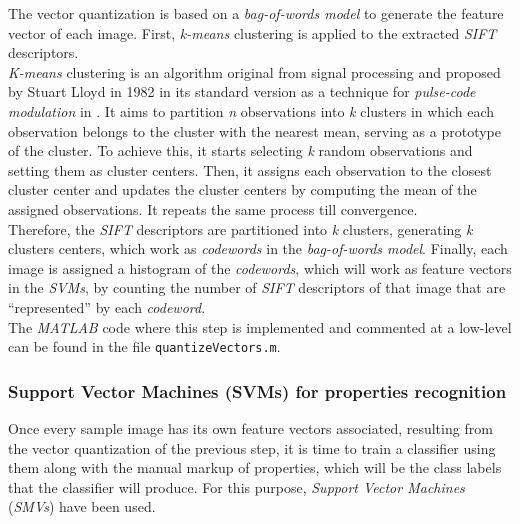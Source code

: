 
The vector quantization is based on a \emph{bag-of-words model} to generate the feature vector of each image. First, \emph{k-means} clustering is applied to the extracted \emph{SIFT} descriptors. \\

\emph{K-means} clustering is an algorithm original from signal processing and proposed by Stuart Lloyd in 1982 in its standard version as a technique for \emph{pulse-code modulation} in \cite{Lloyd_1982_LSQ}. It aims to partition \emph{n} observations into \emph{k} clusters in which each observation belongs to the cluster with the nearest mean, serving as a prototype of the cluster. To achieve this, it starts selecting \emph{k} random observations and setting them as cluster centers. Then, it assigns each observation to the closest cluster center and updates the cluster centers by computing the mean of the assigned observations. It repeats the same process till convergence. \\

Therefore, the \emph{SIFT} descriptors are partitioned into \emph{k} clusters, generating \emph{k} clusters centers, which work as \emph{codewords} in the \emph{bag-of-words model}. Finally, each image is assigned a histogram of the \emph{codewords}, which will work as feature vectors in the \emph{SVMs}, by counting the number of \emph{SIFT} descriptors of that image that are ``represented'' by each \emph{codeword}. \\

The \emph{MATLAB} code where this step is implemented and commented at a low-level can be found in the file \texttt{quantizeVectors.m}.

\newpage
\subsubsection{Support Vector Machines (SVMs) for properties recognition}

Once every sample image has its own feature vectors associated, resulting from the vector quantization of the previous step, it is time to train a classifier using them along with the manual markup of properties, which will be the class labels that the classifier will produce. For this purpose, \emph{Support Vector Machines} (\emph{SMVs}) have been used. \\

